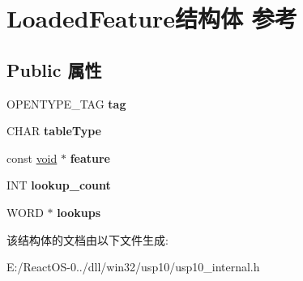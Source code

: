 \hypertarget{struct_loaded_feature}{}\section{Loaded\+Feature结构体 参考}
\label{struct_loaded_feature}
\subsection*{Public 属性}
\begin{DoxyCompactItemize}
\item 
\mbox{\label{struct_loaded_feature_a136018eb2a1810a7051ed46283119177}} 
O\+P\+E\+N\+T\+Y\+P\+E\+\_\+\+T\+AG {\bfseries tag}
\item 
\mbox{\label{struct_loaded_feature_aa76e35cb5d75bc7fbd9ad1bcd1447eaa}} 
C\+H\+AR {\bfseries table\+Type}
\item 
\mbox{\label{struct_loaded_feature_a312541ce997328c08f98d1d1b5088c1a}} 
const \hyperlink{interfacevoid}{void} $\ast$ {\bfseries feature}
\item 
\mbox{\label{struct_loaded_feature_ac40aa00110d9f9f8255b9c275c97d548}} 
I\+NT {\bfseries lookup\+\_\+count}
\item 
\mbox{\label{struct_loaded_feature_abf97270a95d12fc214f473be60af8f71}} 
W\+O\+RD $\ast$ {\bfseries lookups}
\end{DoxyCompactItemize}


该结构体的文档由以下文件生成\+:\begin{DoxyCompactItemize}
\item 
E\+:/\+React\+O\+S-\/0../dll/win32/usp10/usp10\+\_\+internal.\+h\end{DoxyCompactItemize}
